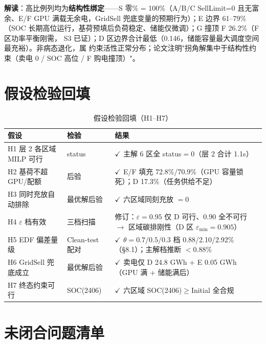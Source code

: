 \documentclass{internal-report}
\begin{document}
\textbf{解读}：高比例列均为\textbf{结构性绑定}——S 零\% = 100\%（A/B/C SellLimit=0
且无富余、E/F GPU 满载无余电，GridSell 兜底变量的预期行为）；E 边界 61--79\%（SOC
长期高位运行，基荷预填后负荷稳定、储能仅微调）；G 撞顶 F 26.2\%（F 区功率平衡刚需，
S3 已证）；D 区边界合计最低（0.146，储能容量最大调度空间最充裕）。非病态退化，属
约束活性正常分布；论文注明"拐角解集中于结构性约束（卖电 0 / SOC 高位 / F 购电撞顶）"。

\section{假设检验回填}

\begin{table}[H]
\centering
\footnotesize
\begin{tabular}{lll}
\toprule
假设 & 检验 & 结果 \\
\midrule
H1 层 2 各区域 MILP 可行 & status & $\checkmark$ 主解 6 区全 status$=0$（层 2 合计 1.1s） \\
H2 基荷不超 GPU/配额 & 后验 & $\checkmark$ E/F 填充 72.8\%/70.9\%（GPU 容量锁死）；D 17.3\%（任务供给不足） \\
H3 同时充放自动排除 & 最优解后验 & $\checkmark$ 六区域同刻充放 $=0$ \\
H4 $\varepsilon$ 档有效 & 三档扫描 & 修订：$\varepsilon{=}0.95$ 仅 D 可行、$0.90$ 全不可行 $\to$ 区域碳排刚性（D 区 $\varepsilon_{\min}{=}0.905$） \\
H5 EDF 偏差量级 & Clean-test 配对 & $\checkmark$ $\theta{=}0.7/0.5/0.3$ 档 0.88/2.10/2.92\%（§8.1）；主解档推断 $<0.88\%$ \\
H6 GridSell 兜底成立 & 最优解后验 & $\checkmark$ 卖电仅 D 24.8 GWh + E 0.05 GWh（GPU 满 + 储能满后） \\
H7 终态约束可行 & SOC(2406) & $\checkmark$ 六区域 SOC(2406)$\ge$Initial 全合规 \\
\bottomrule
\end{tabular}
\caption{假设检验回填（H1--H7）}
\label{tab:h}
\end{table}

\section{未闭合问题清单}
\end{document}
